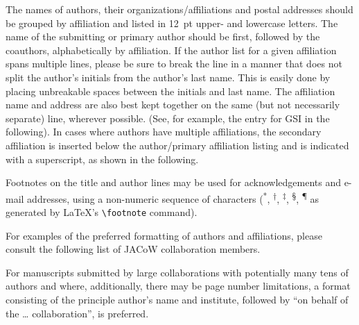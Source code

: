 
\flushcolsend

The names of authors, their organizations/affiliations
and postal addresses should be grouped by affiliation and
listed in \SI{12}{pt} upper- and lowercase letters. The name of
the submitting or primary author should be first, followed
by the coauthors, alphabetically by affiliation. If the
author list for a given affiliation spans multiple lines,
please be sure to break the line in a manner that does not
split the author’s initials from the author’s last name. This
is easily done by placing unbreakable spaces between the
initials and last name. The affiliation name and address
are also best kept together on the same (but not necessarily
separate) line, wherever possible. (See, for example,
the entry for GSI in the following). In cases where authors
have multiple affiliations, the secondary affiliation is
inserted below the author/primary affiliation listing and is
indicated with a superscript, as shown in the following.


Footnotes on the title and author lines may be used for
acknowledgements and e-mail addresses, using a non-numeric
sequence of characters (\textsuperscript{*}, \textsuperscript{†},
\textsuperscript{‡}, \textsuperscript{§}, \textsuperscript{\P}
as generated by \LaTeX's \verb|\footnote| command).

For examples of the preferred formatting of authors and
affiliations, please consult the following list of JACoW
collaboration members.

For manuscripts submitted by large collaborations with
potentially many tens of authors and where, additionally,
there may be page number limitations, a format consisting
of the principle author’s name and institute, followed by
“on behalf of the … collaboration”, is preferred.


\clearpage
%
%
{}

\clearpage


